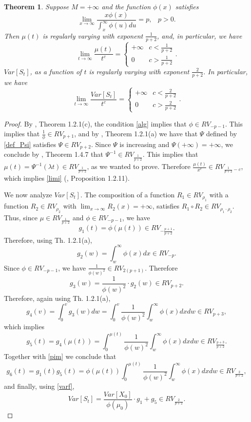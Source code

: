 \documentclass{article}
\newtheorem{thm}{Theorem}[section]
\numberwithin{equation}{section}
\begin{document}
\begin{thm}\label{pow}
Suppose $M=+\infty$ and the function $\phi(x)$ satisfies
\begin{equation}\label{alg}
\lim_{x\rightarrow \infty} \frac{x\phi(x)}{\int_x^{\infty}\phi(u)du}=p,\;\;\;p>0.
\end{equation}	
Then $\mu(t)$ is regularly varying with exponent $\frac{1}{p+2}$, and, in particular, we have
\begin{equation}\label{limi}\lim_{t\rightarrow \infty} \frac{\mu(t)}{t^c}=\begin{cases}
	+\infty & c< \frac{1}{p+2}\\
	0 & c>\frac{1}{p+2}\end{cases}.\end{equation}
	$Var[S_t]$, as a function of $t$ is regularly varying with exponent $\frac{2}{p+2}$. In particular, we have
	$$\lim_{t\rightarrow \infty}\frac{Var[S_t]}{t^c}=\begin{cases}
+\infty & c<\frac{2}{p+2}\\
0 & c>\frac{2}{p+2}
\end{cases}.$$
\end{thm}

\begin{proof}
By \cite{Mladenovic}, Theorem 1.2.1(c), the condition \eqref{alg} implies that
$\phi\in RV_{-p-1}$.
This implies that $\frac{1}{\phi}\in RV_{p+1}$, and by  \cite{Mladenovic}, Theorem 1.2.1(a) we have that $\Psi$ defined by 
\eqref{def_Psi} satisfies $\Psi\in RV_{p+2}$. Since $\Psi$ is increasing and $\Psi(+\infty)=+\infty$, 
we conclude by \cite{Mladenovic}, Theorem 1.4.7 that $\Psi^{-1}\in RV_{\frac{1}{p+2}}.$
This implies that $\mu(t)=\Psi^{-1}(\lambda t)\in RV_{\frac{1}{p+2}}$, as we wanted to prove. Therefore
$\frac{\mu(t)}{x^c}\in RV_{\frac{1}{p+2}-c}$, which implies \eqref{limi} (\cite{Mladenovic}, Proposition 1.2.11).

We now analyze $Var[S_t]$.
The composition of  a function  $R_1\in RV_{\rho_1}$ with a function $R_2\in RV_{\rho_2}$ with  $\lim_{x\rightarrow \infty} R_2(x)=+\infty$, satisfies $R_1\circ R_2\in RV_{\rho_1\cdot \rho_2}$.
Thus, since
$\mu\in RV_{\frac{1}{p+2}}$ and $\phi\in RV_{-p-1}$, we have
\begin{equation}\label{pim}g_1(t)=\phi(\mu(t))\in RV_{-\frac{p+1}{p+2}}. 
\end{equation}
Therefore, using \cite{Mladenovic} Th. 1.2.1(a),
$$g_2(w)=\int_w^\infty \phi(x)dx \in RV_{-p}.$$
Since $\phi\in RV_{-p-1}$, we have $\frac{1}{\phi(w)^2}\in RV_{2(p+1)}$. Therefore $$g_3(w)=\frac{1}{\phi(w)^2}\cdot g_2(w)\in RV_{p+2}.$$
Therefore, again using \cite{Mladenovic} Th. 1.2.1(a),
$$g_4(v)=\int_0^v g_3(w)dw=\int_0^v \frac{1}{\phi(w)^2}\int_w^\infty \phi(x)dx dw\in RV_{p+3},$$
which implies
$$g_5(t)=g_4(\mu(t))=\int_0^{\mu(t)} \frac{1}{\phi(w)^2}\int_w^\infty \phi(x)dx dw\in RV_{\frac{p+3}{p+2}}.$$ 
Together with 
\eqref{pim} we conclude that
$$g_6(t)=g_1(t)g_5(t)=\phi(\mu(t))\int_0^{\mu(t)} \frac{1}{\phi(w)^2}\int_w^\infty \phi(x)dx dw \in RV_{\frac{2}{p+2}},$$
and finally, using \eqref{varf},
$$Var[S_t]=\frac{Var[X_0]}{\phi(\mu_0)}\cdot g_1+g_5\in RV_{\frac{2}{p+2}}.$$

\end{proof}
\end{document}
